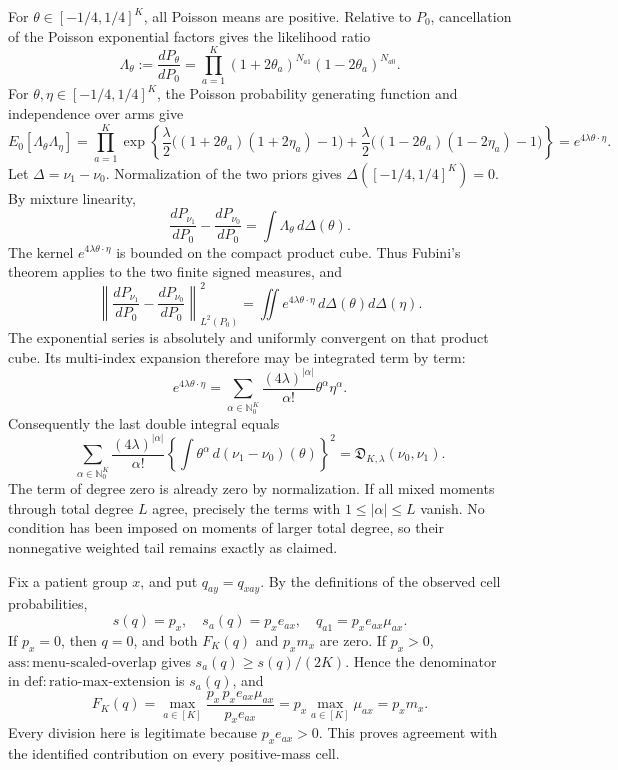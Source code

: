 For \(\theta\in[-1/4,1/4]^K\), all Poisson means are positive.  Relative to \(P_0\), cancellation of the Poisson exponential factors gives the likelihood ratio
\[
 \Lambda_\theta:=\frac{dP_\theta}{dP_0}
 =\prod_{a=1}^K(1+2\theta_a)^{N_{a1}}(1-2\theta_a)^{N_{a0}}.
\]
For \(\theta,\eta\in[-1/4,1/4]^K\), the Poisson probability generating function and independence over arms give
\[
 E_0[\Lambda_\theta\Lambda_\eta]
 =\prod_{a=1}^K
   \exp\!\left\{\frac\lambda2\bigl((1+2\theta_a)(1+2\eta_a)-1\bigr)
                   +\frac\lambda2\bigl((1-2\theta_a)(1-2\eta_a)-1\bigr)\right\}
 =e^{4\lambda\theta\cdot\eta}.
\]
Let \(\Delta=\nu_1-\nu_0\).  Normalization of the two priors gives \(\Delta([-1/4,1/4]^K)=0\).  By mixture linearity,
\[
 \frac{dP_{\nu_1}}{dP_0}-\frac{dP_{\nu_0}}{dP_0}
 =\int \Lambda_\theta\,d\Delta(\theta).
\]
The kernel \(e^{4\lambda\theta\cdot\eta}\) is bounded on the compact product cube.  Thus Fubini's theorem applies to the two finite signed measures, and
\[
 \left\|\frac{dP_{\nu_1}}{dP_0}-\frac{dP_{\nu_0}}{dP_0}\right\|_{L^2(P_0)}^2
 =\iint e^{4\lambda\theta\cdot\eta}\,d\Delta(\theta)d\Delta(\eta).
\]
The exponential series is absolutely and uniformly convergent on that product cube.  Its multi-index expansion therefore may be integrated term by term:
\[
 e^{4\lambda\theta\cdot\eta}
 =\sum_{\alpha\in\mathbb N_0^K}
   \frac{(4\lambda)^{|\alpha|}}{\alpha!}\theta^\alpha\eta^\alpha.
\]
Consequently the last double integral equals
\[
 \sum_{\alpha\in\mathbb N_0^K}
 \frac{(4\lambda)^{|\alpha|}}{\alpha!}
 \left\{\int\theta^\alpha\,d(\nu_1-\nu_0)(\theta)\right\}^2
 =\mathfrak D_{K,\lambda}(\nu_0,\nu_1).
\]
The term of degree zero is already zero by normalization.  If all mixed moments through total degree \(L\) agree, precisely the terms with \(1\leq|\alpha|\leq L\) vanish.  No condition has been imposed on moments of larger total degree, so their nonnegative weighted tail remains exactly as claimed.

Fix a patient group \(x\), and put \(q_{ay}=q_{xay}\).  By the definitions of the observed cell probabilities,
\[
 s(q)=p_x,\quad s_a(q)=p_xe_{ax},\quad q_{a1}=p_xe_{ax}\mu_{ax}.
\]
If \(p_x=0\), then \(q=0\), and both \(F_K(q)\) and \(p_xm_x\) are zero.  If \(p_x>0\), \(\mathrm{ass{:}menu\text{-}scaled\text{-}overlap}\) gives \(s_a(q)\geq s(q)/(2K)\).  Hence the denominator in \(\mathrm{def{:}ratio\text{-}max\text{-}extension}\) is \(s_a(q)\), and
\[
 F_K(q)=\max_{a\in[K]}\frac{p_x\,p_xe_{ax}\mu_{ax}}{p_xe_{ax}}
       =p_x\max_{a\in[K]}\mu_{ax}=p_xm_x.
\]
Every division here is legitimate because \(p_xe_{ax}>0\).  This proves agreement with the identified contribution on every positive-mass cell.

